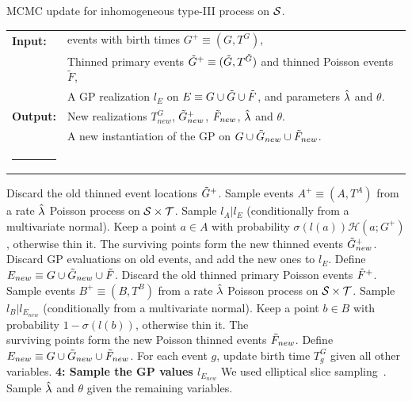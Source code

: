 \documentclass{statsoc}
\begin{document}
\begin{algorithm}
\caption{MCMC update for inhomogeneous \matern type-III process on ${\mathcal S}$.}
\vspace{-.1in}
\begin{tabular}{p{1.4cm}p{12.2cm}}
\textbf{Input:}  & \matern events with birth times $G^+ \equiv (G,T^G)$, \\
    & Thinned primary events $\tilde{G}^+ \equiv (\tilde{G},T^{\tilde{G}})$ and thinned Poisson events $\tilde{F}$, \\
    & A GP realization $l_E$ on $E \equiv G \cup \tilde{G} \cup \tilde{F}$, and parameters $\hat{\lambda}$ and $\theta$.  \\
\textbf{Output:} & New realizations $T^G_{new}$, $\tilde{G}_{new}^+$, $\tilde{F}_{new}$, $\hat{\lambda}$ and $\theta$. \\
    &  A new instantiation of the GP on $G \cup \tilde{G}_{new} \cup \tilde{F}_{new}$. \\
\rule[0.5ex]{33em}{0.55pt}
\end{tabular}
\begin{algorithmic}
\StartG
\State  Discard the old \matern thinned event locations $\tilde{G}^+$.
\State Sample events $A^+ \equiv (A, T^A)$ from a rate $\hat{\lambda}$ Poisson process on ${\mathcal S} \times {\mathcal T}$. 
\State Sample $l_A | l_E$ (conditionally from a multivariate normal).
\State Keep a point $a \in A$ with probability $\sigma(l(a)) \mathscr{H}(a;G^+)$, otherwise thin it. 
\State The surviving points form the new \matern thinned events $\tilde{G}^+_{new}$.
\State Discard GP evaluations on old \matern events, and add the new ones to $l_E$.
\EndG
\vspace{-.15in}
\StartF
\State Define $E_{new} \equiv G \cup \tilde{G}_{new} \cup \tilde{F}$.
\State  Discard the old thinned primary Poisson events $\tilde{F}^+$.
\State Sample events $B^+ \equiv (B, T^B)$ from a rate $\hat{\lambda}$ Poisson process on ${\mathcal S} \times {\mathcal T}$. 
\State Sample $l_B | l_{E_{new}}$ (conditionally from a multivariate normal).
\State  Keep a point $b \in B$ with probability $1 - \sigma(l(b))$, otherwise thin it. 
       The\\ \qquad surviving points form the new Poisson thinned events $\tilde{F}_{new}$.
\State Define $E_{new} \equiv G \cup \tilde{G}_{new} \cup \tilde{F}_{new}$.
\EndF
\vspace{-.15in}
\StartMisc
\State   For each \matern event $g$, update birth time $T^G_g$ given all other variables.
\EndMisc
\vspace{-.15in}
\State \label{step:gp_inf}\!\textbf{4: Sample the GP values $l_{E_{new}}$} 
\State \hspace{.2in} We used elliptical slice sampling~\citep{murray2010}.
\StartParam
\State   Sample $\hat{\lambda}$ and $\theta$ given the remaining variables.
\EndParam
\vspace{-.15in}
\end{algorithmic}
\label{alg:mat_np_inf}
\vspace{-.1in}
\end{algorithm}
\end{document}
